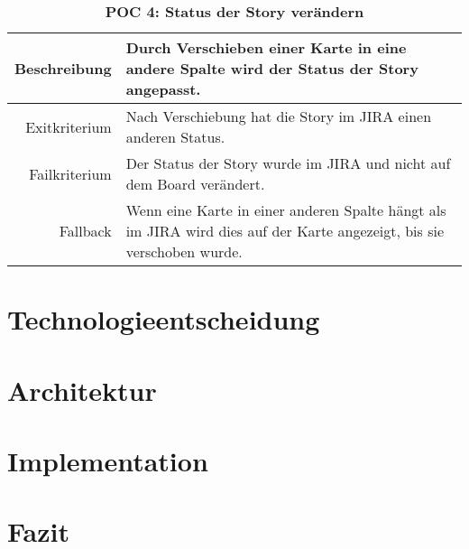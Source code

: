 \documentclass[12pt,titlepage]{scrartcl}
\begin{document}
\begin{table}[H]
\centering
\caption{\textbf{POC 4: Status der Story verändern}}
\label{poc4}
\begin{tabularx}{\linewidth}{|r|X|}
\hline
Beschreibung  & Durch Verschieben einer Karte in eine andere Spalte wird der Status der Story angepasst.  \\ \hline
Exitkriterium & Nach Verschiebung hat die Story im JIRA einen anderen Status. \\ \hline
Failkriterium & Der Status der Story wurde im JIRA und nicht auf dem Board verändert. \\ \hline
Fallback      & Wenn eine Karte in einer anderen Spalte hängt als im JIRA wird dies auf der Karte angezeigt, bis sie verschoben wurde.  \\ \hline
\end{tabularx}
\end{table}
	\newpage	
	\section{Technologieentscheidung}
	\newpage	
	\section{Architektur}
	\newpage
	\section{Implementation}
	\newpage	
	\section{Fazit}
	\newpage

	

 	
\end{document}
